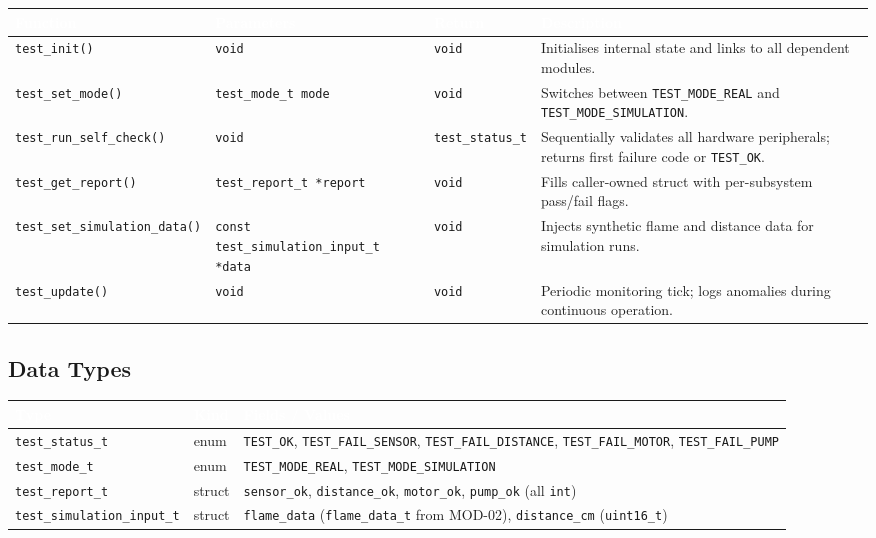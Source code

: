 \documentclass[a4paper,11pt]{article}
\newcommand{\theadtext}[1]{\textcolor{white}{\textbf{#1}}}
\begin{document}
\begin{tabular}{L{3.74cm} L{3.74cm} L{2.38cm} L{7.14cm}}
\toprule
{}
\theadtext{Function} & \theadtext{Parameters} & \theadtext{Return} & \theadtext{Description} \\
\midrule
{}   \texttt{test\_init()}                  & \texttt{void}                                      & \texttt{void}            & Initialises internal state and links to all dependent modules. \\
 \texttt{test\_set\_mode()}             & \texttt{test\_mode\_t mode}                        & \texttt{void}            & Switches between \texttt{TEST\_MODE\_REAL} and \texttt{TEST\_MODE\_SIMULATION}. \\
   \texttt{test\_run\_self\_check()}      & \texttt{void}                                      & \texttt{test\_status\_t} & Sequentially validates all hardware peripherals; returns first failure code or \texttt{TEST\_OK}. \\
 \texttt{test\_get\_report()}           & \texttt{test\_report\_t *report}                   & \texttt{void}            & Fills caller-owned struct with per-subsystem pass/fail flags. \\
   \texttt{test\_set\_simulation\_data()} & \texttt{const test\_simulation\_input\_t *data}    & \texttt{void}            & Injects synthetic flame and distance data for simulation runs. \\
 \texttt{test\_update()}                & \texttt{void}                                      & \texttt{void}            & Periodic monitoring tick; logs anomalies during continuous operation. \\
\bottomrule
\end{tabular}

\subsection{Data Types}

\begin{tabular}{L{4.25cm} L{2.04cm} L{10.71cm}}
\toprule
{}
\theadtext{Type} & \theadtext{Kind} & \theadtext{Fields / Values} \\
\midrule
{}   \texttt{test\_status\_t}            & enum   & \texttt{TEST\_OK}, \texttt{TEST\_FAIL\_SENSOR}, \texttt{TEST\_FAIL\_DISTANCE}, \texttt{TEST\_FAIL\_MOTOR}, \texttt{TEST\_FAIL\_PUMP} \\
 \texttt{test\_mode\_t}              & enum   & \texttt{TEST\_MODE\_REAL}, \texttt{TEST\_MODE\_SIMULATION} \\
   \texttt{test\_report\_t}            & struct & \texttt{sensor\_ok}, \texttt{distance\_ok}, \texttt{motor\_ok}, \texttt{pump\_ok} (all \texttt{int}) \\
 \texttt{test\_simulation\_input\_t} & struct & \texttt{flame\_data} (\texttt{flame\_data\_t} from MOD-02), \texttt{distance\_cm} (\texttt{uint16\_t}) \\
\bottomrule
\end{tabular}
\end{document}

